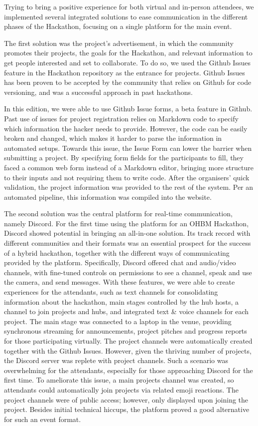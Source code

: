 \documentclass[12pt,a4paper]{proc}
\begin{document}
Trying to bring a positive experience for both virtual and in-person
attendees, we implemented several integrated solutions to ease
communication in the different phases of the Hackathon, focusing on a
single platform for the main event.

The first solution was the project's advertisement, in which the
community promotes their projects, the goals for the Hackathon, and
relevant information to get people interested and set to collaborate. To
do so, we used the Github Issues feature in the Hackathon
repository as the entrance for projects. Github Issues has been proven
to be accepted by the community that relies on Github for code
versioning, and was a successful approach in past hackathons.

In this edition, we were able to use Github Issue forms, a beta feature
in Github. Past use of issues for project registration relies on
Markdown code to specify which information the hacker needs to provide.
However, the code can be easily broken and changed, which makes it
harder to parse the information in automated setups. Towards this issue,
the Issue Form can lower the barrier when submitting a project. By
specifying form fields for the participants to fill, they faced a common
web form instead of a Markdown editor, bringing more structure to their
inputs and not requiring them to write code. After the organisers' quick
validation, the project information was provided to the rest of the
system. Per an automated pipeline, this information was compiled into
the website.

The second solution was the central platform for real-time
communication, namely Discord. For the first time using the platform for
an OHBM Hackathon, Discord showed potential in bringing an all-in-one
solution. Its track record with different communities and their formats
was an essential prospect for the success of a hybrid hackathon,
together with the different ways of communicating provided by the
platform. Specifically, Discord offered chat and audio/video channels,
with fine-tuned controls on permissions to see a channel, speak and use
the camera, and send messages. With these features, we were able to
create experiences for the attendants, such as text channels for
consolidating information about the hackathon, main stages controlled by
the hub hosts, a channel to join projects and hubs, and integrated text
\& voice channels for each project. The main stage was connected to a
laptop in the venue, providing synchronous streaming for announcements,
project pitches and progress reports for those participating virtually.
The project channels were automatically created together with the Github
Issues. However, given the thriving number of projects, the Discord
server was replete with project channels. Such a scenario was
overwhelming for the attendants, especially for those approaching
Discord for the first time. To ameliorate this issue, a main projects
channel was created, so attendants could automatically join projects via
related emoji reactions. The project channels were of public access;
however, only displayed upon joining the project. Besides initial
technical hiccups, the platform proved a good alternative for such an
event format.
\end{document}

